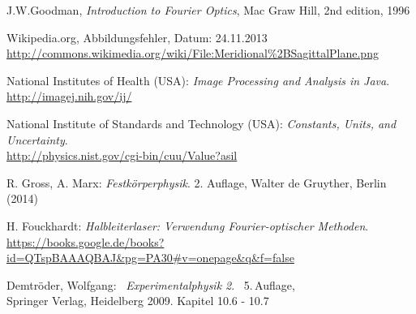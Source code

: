 \documentclass[a4paper, parskip=half, 12pt, bibliography=totocnumbered]{scrartcl}
\begin{document}





\begin{thebibliography}{10}
 J.W.Goodman, \emph{Introduction to Fourier Optics}, Mac Graw Hill, 2nd edition, 1996

 Wikipedia.org, Abbildungsfehler, Datum: 24.11.2013\\
\url{http://commons.wikimedia.org/wiki/File:Meridional%2BSagittalPlane.png}

 National Institutes of Health (USA): \emph{Image Processing and Analysis in Java}.\\
\url{http://imagej.nih.gov/ij/}

 National Institute of Standards and Technology (USA): \emph{Constants, Units, and Uncertainty}.\\
\url{http://physics.nist.gov/cgi-bin/cuu/Value?asil}

 R. Gross, A. Marx: \emph{Festkörperphysik}. 2. Auflage, Walter de Gruyther, Berlin (2014)

 H. Fouckhardt: \emph{Halbleiterlaser: Verwendung Fourier-optischer Methoden}.\\
\url{https://books.google.de/books?id=QTspBAAAQBAJ&pg=PA30#v=onepage&q&f=false}

	Demtröder, Wolfgang:~ \emph{Experimentalphysik 2}.~ 5.\,Auflage,\\
	Springer Verlag, Heidelberg 2009.	\hfill		Kapitel 10.6 - 10.7
\end{thebibliography}
\end{document}
